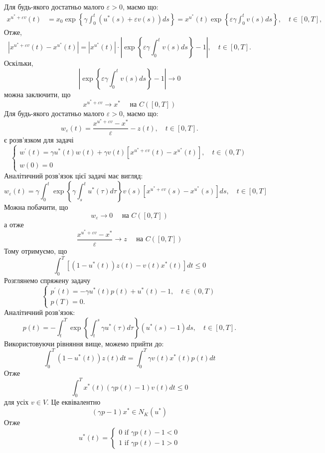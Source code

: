 \documentclass[a4paper,12pt]{extreport}
\begin{document}
Для будь-якого достатньо малого $\varepsilon>0$, маємо що:
$$
\begin{aligned}
x^{u^*+\varepsilon v}(t) &=x_0 \exp \left\{\gamma \int_0^t\left(u^*(s)+\varepsilon v(s)\right) d s\right\} 
=x^{u^*}(t) \exp \left\{\varepsilon \gamma \int_0^t v(s) d s\right\}, \quad t \in[0, T],
\end{aligned}
$$
Отже,
$$
\left|x^{u^*+\varepsilon v}(t)-x^{u^*}(t)\right|=\left|x^{u^*}(t)\right| \cdot\left|\exp \left\{\varepsilon \gamma \int_0^t v(s) d s\right\}-1\right|, \quad t \in[0, T] .
$$
Оскільки,
$$
\left|\exp \left\{\varepsilon \gamma \int_0^t v(s) d s\right\}-1\right| \longrightarrow 0
$$
можна заключити, що 
$$
x^{u^*+\varepsilon v} \longrightarrow x^* \quad \text { на } C([0, T])
$$
Для будь-якого достатньо малого $\varepsilon>0$, маємо що:
$$
w_{\varepsilon}(t)=\frac{x^{u^*+\varepsilon v}-x^*}{\varepsilon}-z(t), \quad t \in[0, T] .
$$
є розв'язком для задачі
$$
\left\{\begin{array}{l}
w^{\prime}(t)=\gamma u^*(t) w(t)+\gamma v(t)\left[x^{u^*+\varepsilon v}(t)-x^{u^*}(t)\right], \quad t \in(0, T) \\
w(0)=0
\end{array}\right.
$$
Аналітичний розв'язок цієї задачі має вигляд:
$$
w_{\varepsilon}(t)=\gamma \int_0^t \exp \left\{\gamma \int_s^t u^*(\tau) d \tau\right\} v(s)\left[x^{u^*+\varepsilon v}(s)-x^{u^*}(s)\right] d s, \quad t \in[0, T]
$$
Можна побачити, що 
$$
w_{\varepsilon} \longrightarrow 0 \quad \text { на } C([0, T])
$$
а отже
$$
\frac{x^{u^*+\varepsilon v}-x^*}{\varepsilon} \longrightarrow z \quad \text { на } C([0, T])
$$
Тому отримуємо, що 
$$
\int_0^T\left[\left(1-u^*(t)\right) z(t)-v(t) x^*(t)\right] d t \leq 0
$$
Розглянемо спряжену задачу
$$
\left\{\begin{array}{l}
p^{\prime}(t)=-\gamma u^*(t) p(t)+u^*(t)-1, \quad t \in(0, T) \\
p(T)=0 .
\end{array}\right.
$$Аналітичний розв'язок:
$$
p(t)=-\int_t^T \exp \left\{\int_t^s \gamma u^*(\tau) d \tau\right\}\left(u^*(s)-1\right) d s, \quad t \in[0, T] .
$$
Використовуючи рівняння вище, можемо прийти до:
$$
\int_0^T\left(1-u^*(t)\right) z(t) d t=\int_0^T \gamma v(t) x^*(t) p(t) d t
$$
Отже
$$
\int_0^T x^*(t)(\gamma p(t)-1) v(t) d t \leq 0
$$
для усіх $v \in V$.
Це еквівалентно 
$$
(\gamma p-1) x^* \in N_K\left(u^*\right)
$$
Отже 
$$
u^*(t)=\left\{\begin{array}{l}
0 \text { if } \gamma p(t)-1<0 \\
1 \text { if } \gamma p(t)-1>0
\end{array}\right.
$$
\end{document}
